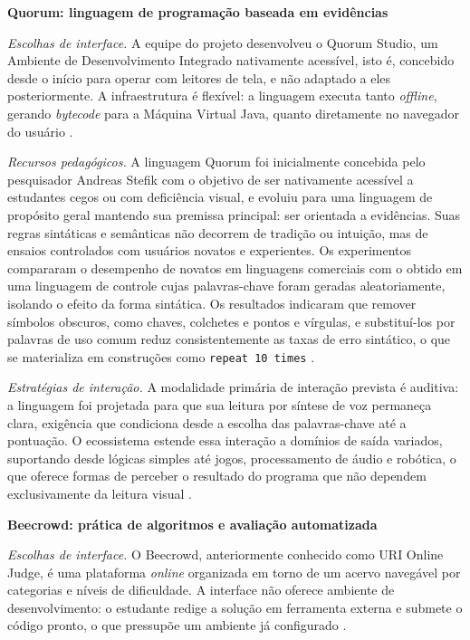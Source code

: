 
\noindent\textbf{Quorum: linguagem de programação baseada em evidências}

\textit{Escolhas de interface.} A equipe do projeto desenvolveu o Quorum Studio, um Ambiente de Desenvolvimento Integrado nativamente acessível, isto é, concebido desde o início para operar com leitores de tela, e não adaptado a eles posteriormente. A infraestrutura é flexível: a linguagem executa tanto \textit{offline}, gerando \textit{bytecode} para a Máquina Virtual Java, quanto diretamente no navegador do usuário \cite{ladner2019,quorum2025}.

\textit{Recursos pedagógicos.} A linguagem Quorum foi inicialmente concebida pelo pesquisador Andreas Stefik com o objetivo de ser nativamente acessível a estudantes cegos ou com deficiência visual, e evoluiu para uma linguagem de propósito geral mantendo sua premissa principal: ser orientada a evidências. Suas regras sintáticas e semânticas não decorrem de tradição ou intuição, mas de ensaios controlados com usuários novatos e experientes. Os experimentos compararam o desempenho de novatos em linguagens comerciais com o obtido em uma linguagem de controle cujas palavras-chave foram geradas aleatoriamente, isolando o efeito da forma sintática. Os resultados indicaram que remover símbolos obscuros, como chaves, colchetes e pontos e vírgulas, e substituí-los por palavras de uso comum reduz consistentemente as taxas de erro sintático, o que se materializa em construções como \texttt{repeat 10 times} \cite{stefik2013}.

\textit{Estratégias de interação.} A modalidade primária de interação prevista é auditiva: a linguagem foi projetada para que sua leitura por síntese de voz permaneça clara, exigência que condiciona desde a escolha das palavras-chave até a pontuação. O ecossistema estende essa interação a domínios de saída variados, suportando desde lógicas simples até jogos, processamento de áudio e robótica, o que oferece formas de perceber o resultado do programa que não dependem exclusivamente da leitura visual \cite{ladner2019,quorum2025}.

\noindent\textbf{Beecrowd: prática de algoritmos e avaliação automatizada}

\textit{Escolhas de interface.} O Beecrowd, anteriormente conhecido como URI Online Judge, é uma plataforma \textit{online} organizada em torno de um acervo navegável por categorias e níveis de dificuldade. A interface não oferece ambiente de desenvolvimento: o estudante redige a solução em ferramenta externa e submete o código pronto, o que pressupõe um ambiente já configurado \cite{garcia2024}.

